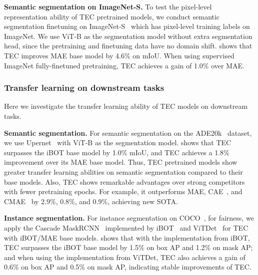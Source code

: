 \documentclass{article} \usepackage{iclr2023_conference,times}
\newcommand{\myPara}[1]{\vspace{-.05in} \noindent\textbf{#1}}
\begin{document}
\myPara{Semantic segmentation on ImageNet-S.} 
To test the pixel-level representation ability of TEC pretrained models, we conduct semantic segmentation finetuning on ImageNet-S~\citep{gao2021luss} which has  pixel-level training labels on ImageNet.
We use ViT-B as the segmentation model without   extra segmentation head, since the pretraining and finetuning data have no domain shift. 
  shows that 
 TEC improves   MAE base model by 4.6\% on  mIoU. When using  supervised ImageNet fully-finetuned pretraining, TEC achieves a gain of 1.0\% over MAE.

\vspace{-10pt}
\subsubsection{Transfer learning on downstream tasks}
\vspace{-10pt}
Here we investigate the transfer learning ability of TEC models on downstream tasks.

\myPara{Semantic segmentation.}
For semantic segmentation on the ADE20k~\citep{zhou2018semantic} dataset, we use Upernet~\citep{xiao2018unified} with  ViT-B as the segmentation model.
 shows that TEC surpasses the iBOT base model by 1.0\%   mIoU, and
TEC achieves a 1.8\% improvement  over its MAE base model.
Thus, TEC pretrained models show greater transfer learning abilities on semantic segmentation compared to their base models.
Also, TEC shows remarkable advantages over strong competitors with fewer pretraining epochs. For example, it outperforms MAE, CAE~\citep{chen2022context}, and CMAE~\citep{huang2022contrastive} by 2.9\%, 0.8\%, and 0.9\%, achieving new SOTA.


\myPara{Instance segmentation.}
For instance segmentation on COCO~\citep{lin2014microsoft}, for fairness, we apply the Cascade MaskRCNN~\citep{cai2019cascade} implemented by iBOT~\citep{zhou2021ibot} and ViTDet~\citep{li2022exploring} for TEC with iBOT/MAE base models.
  shows that with the  implementation from iBOT, TEC surpasses the iBOT base model by 1.5\% on box AP and 1.2\% on mask AP; and when using the implementation from ViTDet, TEC also achieves a gain of 0.6\% on box AP and 0.5\% on mask AP, indicating stable improvements of TEC.
 \vspace{-10pt}
\end{document}
